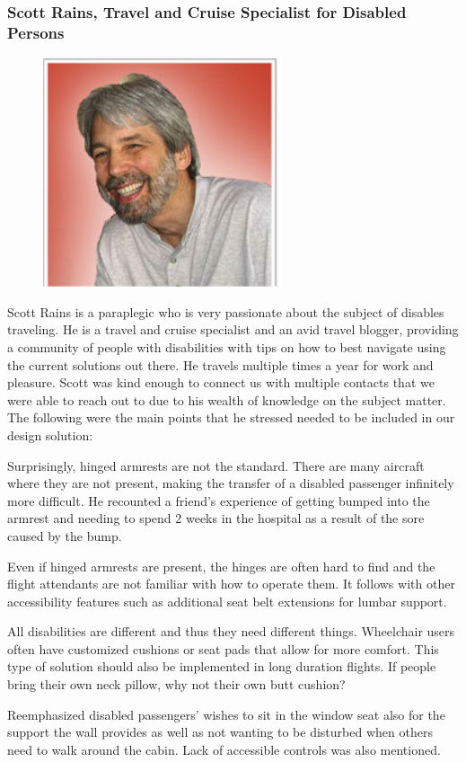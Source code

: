 \subsubsection{Scott Rains, Travel and Cruise Specialist for Disabled Persons}
\begin{figure}[h]
  \centering
     \includegraphics[width=7cm]{images/image024}
  \label{fig:24}
\end{figure}

Scott Rains is a paraplegic who is very passionate about the subject of disables traveling. He is a travel and cruise specialist and an avid travel blogger, providing a community of people with disabilities with tips on how to best navigate using the current solutions out there.  He travels multiple times a year for work and pleasure.  Scott was kind enough to connect us with multiple contacts that we were able to reach out to due to his wealth of knowledge on the subject matter.  The following were the main points that he stressed needed to be included in our design solution: 

\begin{list}{-}{}
  \item Surprisingly, hinged armrests are not the standard. There are many aircraft where they are not present, making the transfer of a disabled passenger infinitely more difficult. He recounted a friend’s experience of getting bumped into the armrest and needing to spend 2 weeks in the hospital as a result of the sore caused by the bump. 
  \item Even if hinged armrests are present, the hinges are often hard to find and the flight attendants are not familiar with how to operate them. It follows with other accessibility features such as additional seat belt extensions for lumbar support.
  \item All disabilities are different and thus they need different things. Wheelchair users often have customized cushions or seat pads that allow for more comfort. This type of solution should also be implemented in long duration flights. If people bring their own neck pillow, why not their own butt cushion?
  \item Reemphasized disabled passengers’ wishes to sit in the window seat also for the support the wall provides as well as not wanting to be disturbed when others need to walk around the cabin. Lack of accessible controls was also mentioned. 
\end{list}


